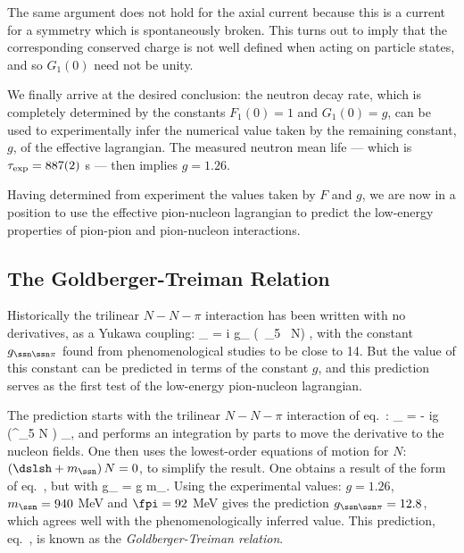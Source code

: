 \documentclass[12pt]{report}
\begin{document}
The same argument does not hold for the axial current
because this is a current for a symmetry which is
spontaneously broken. This turns out to imply that the
corresponding conserved charge is not well defined when
acting on particle states, and so $G_1(0)$ need not be
unity.

We finally arrive at the desired conclusion: the neutron
decay rate, which is completely determined by the constants
$F_1(0) = 1$ and $G_1(0) = g$, can be used to experimentally
infer the numerical value taken by the remaining constant,
$g$, of the effective lagrangian. The measured neutron mean
life --- which is $\tau_{\rm exp} = 887(2)$ s --- then
implies $g = 1.26$.

Having determined from experiment the values taken by $F$
and $g$, we are now in a position to use the effective
pion-nucleon lagrangian to predict the low-energy
properties of pion-pion and pion-nucleon interactions.

\subsection{The Goldberger-Treiman Relation}

Historically the trilinear $N-N-\pi$ interaction has been
written with no derivatives, as a Yukawa coupling: 
%
\eq
\label{yukawaform}
\Scl_{\ssn\ssn\pi} = i g_{\ssn\ssn\pi} \; 
(\Nbr \, \gamma_5 \vec\tau \, N)  \cdot
\vec\pi,
\eeq
%
with the constant $g_{\ssn\ssn\pi}$ found from
phenomenological studies to be close to 14. But the value
of this constant can be predicted in terms of the constant
$g$, and this prediction serves as the first test of the
low-energy pion-nucleon lagrangian.

The prediction starts with the trilinear $N-N-\pi$
interaction of
eq.~:
%
\eq
\label{trilinearnnpi}
\Scl_{\ssn\ssn\pi} = - \; {ig  \fpi} \, 
\left(\Nbr \gamma^\mu \gamma_5
\vec \tau N \right) \cdot \partial_\mu \vec \pi , \eeq
%
and performs an integration by parts to move the derivative
to the nucleon fields. One then uses the lowest-order
equations of motion for $N$: \ie\ $(\dslsh + m_\ssn)\, N =
0$, to simplify the result. One obtains a result of the
form of eq.~, but with  
%
\eq
\label{predictionforgpin}
g_{\ssn\ssn\pi} = {g m_\ssn \over \fpi}.
\eeq
%
Using the experimental values: $g = 1.26$, $m_\ssn = 940$
MeV and $\fpi = 92$ MeV gives the prediction
$g_{\ssn\ssn\pi} = 12.8$, which agrees well with the
phenomenologically inferred value. This prediction,
eq.~, is known as the {\em
Goldberger-Treiman relation}.
\end{document}

